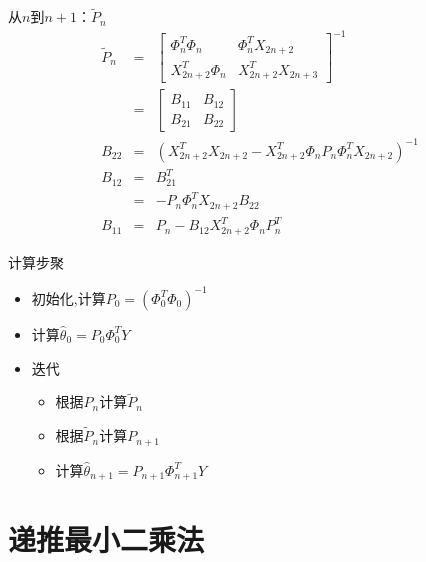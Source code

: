 \begin{frame}{从$n$到$n+1$：$\tilde P_n$}
\begin{eqnarray*}
\tilde{P}_n &=& 
\begin{bmatrix}
\Phi_n^T\Phi_n & \Phi_n^T X_{2n+2} \\
X_{2n+2}^T\Phi_n    & X_{2n+2}^T X_{2n+3}
\end{bmatrix}^{-1} \\
&=& \begin{bmatrix} B_{11} & B_{12} \\ B_{21} & B_{22} \end{bmatrix} \\
B_{22} &=& (X_{2n+2}^T X_{2n+2}-X_{2n+2}^T\Phi_n P_n\Phi_n^T X_{2n+2})^{-1} \\
B_{12} &=& B_{21}^T \\
&=& -P_n \Phi_n^T X_{2n+2} B_{22} \\
B_{11} &=& P_n- B_{12} X_{2n+2}^T\Phi_n P_n^T
\end{eqnarray*}
\end{frame}


\begin{frame}{计算步聚}
\begin{itemize}
\item  初始化,计算$P_0=(\Phi_0^T\Phi_0)^{-1}$
\item  计算$\hat\theta_0=P_0\Phi_0^T Y$
\item 迭代
\begin{itemize}
\item  根据$P_n$计算$\tilde{P}_n$
\item  根据$\tilde{P}_n$计算$P_{n+1}$
\item  计算$\hat\theta_{n+1}=P_{n+1}\Phi_{n+1}^T Y$
\end{itemize}
\end{itemize}
\end{frame}

\section{递推最小二乘法}

